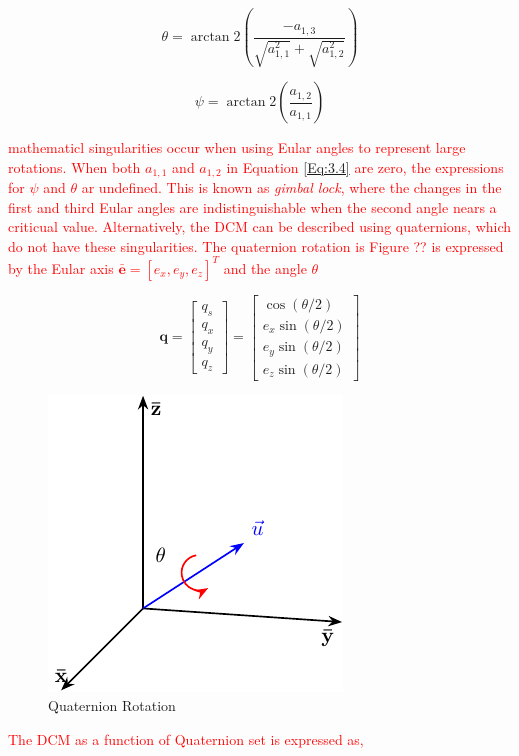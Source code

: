 \begin{equation}
    \theta = \arctan2\left(\frac{-a_{1,3}}{\sqrt{a_{1,1}^2} + \sqrt{a_{1,2}^2}}\right)
\end{equation}

\begin{equation}
    \psi = \arctan2\left(\frac{a_{1,2}}{a_{1,1}}\right)
\end{equation}

\textcolor{red}{mathematicl singularities occur when using Eular angles to represent large rotations. When both $a_{1,1}$ and $a_{1,2}$ in Equation \ref{Eq:3.4} are zero, the expressions
for $\psi$ and $\theta$ ar undefined. This is known as \textit{gimbal lock}, where the changes in the first and third Eular angles are indistinguishable when the second angle nears
a criticual value. Alternatively, the DCM can be described using quaternions, which do not have these singularities. The quaternion rotation is Figure ?? is expressed by the Eular axis
$\mathbf{\bar{e}}=[e_x,e_y,e_z]^T$ and the angle $\theta$}

\begin{equation}
    \mathbf{q} = \begin{bmatrix} q_s \\ q_x \\ q_y \\ q_z \end{bmatrix}
    = \begin{bmatrix} \cos(\theta/2) \\ e_x\sin(\theta/2) \\ e_y\sin(\theta/2) \\ e_z\sin(\theta/2) \end{bmatrix}
\end{equation}

\begin{figure}[H]
    \centering
    \includegraphics[width=0.3\linewidth]{figures/Quaternion.pdf}
    \caption{Quaternion Rotation}
    \label{fig:3.2}
\end{figure}

\textcolor{red}{The DCM as a function of Quaternion set is expressed as,}

